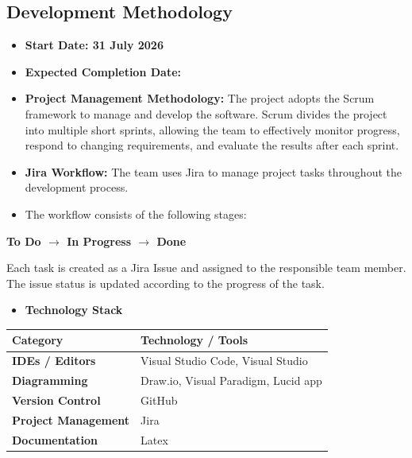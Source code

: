 \subsection{Development Methodology}

\begin{itemize}
  \item \textbf{Start Date: 31 July 2026}
  \item \textbf{Expected Completion Date:}
  \item \textbf{Project Management Methodology:} The project adopts the Scrum framework to manage and develop the software. Scrum divides the project into multiple short sprints, allowing the team to effectively monitor progress, respond to changing requirements, and evaluate the results after each sprint.
  \item \textbf{Jira Workflow:} The team uses Jira to manage project tasks throughout the development process.
  \item The workflow consists of the following stages:
\end{itemize}

\begin{center}
\textbf{To Do $\rightarrow$ In Progress $\rightarrow$ Done}
\end{center}

Each task is created as a Jira Issue and assigned to the responsible team member. The issue status is updated according to the progress of the task.

\begin{itemize}
  \item \textbf{Technology Stack}
\end{itemize}

\begin{longtable}{@{}ll@{}}
\toprule
\textbf{Category} & \textbf{Technology / Tools} \\
\midrule
\endhead
\textbf{IDEs / Editors} & Visual Studio Code, Visual Studio \\
\textbf{Diagramming} & Draw.io, Visual Paradigm, Lucid app \\
\textbf{Version Control} & GitHub \\
\textbf{Project Management} & Jira \\
\textbf{Documentation} & Latex \\
\bottomrule
\end{longtable}
